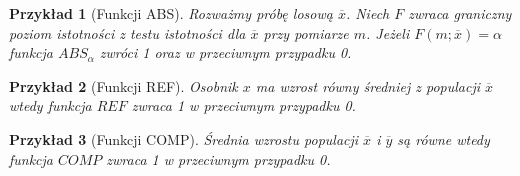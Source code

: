 \documentclass[12pt,a4paper]{report}
\newtheorem{przyklad}{Przykład}
\begin{document}
\begin{przyklad}[Funkcji ABS]
Rozważmy próbę losową $\overline{x}$. Niech $F$ zwraca graniczny poziom istotności z testu istotności dla $\overline{x}$ przy pomiarze $m$. Jeżeli $ F(m;\overline{x})=\alpha$ funkcja $ABS_{\alpha}$ zwróci 1 oraz w przeciwnym przypadku 0.
\end{przyklad}
\begin{przyklad}[Funkcji REF]
Osobnik $x$ ma wzrost równy średniej z populacji $\overline{x}$ wtedy funkcja $REF$ zwraca 1 w przeciwnym przypadku 0.
\end{przyklad}
\begin{przyklad}[Funkcji COMP]
Średnia wzrostu populacji $\overline{x}$ i $\overline{y}$ są równe wtedy funkcja $COMP$ zwraca 1 w przeciwnym przypadku 0.
\end{przyklad}
\end{document}
